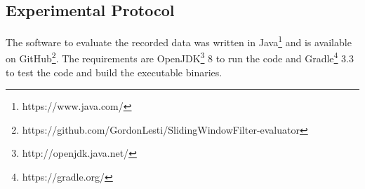 \subsection{Experimental Protocol} \label{experimental_protocol}
The software to evaluate the recorded data was written in Java\footnote{https://www.java.com/} and is available on
GitHub\footnote{https://github.com/GordonLesti/SlidingWindowFilter-evaluator}. The requirements are
OpenJDK\footnote{http://openjdk.java.net/} 8 to run the code and Gradle\footnote{https://gradle.org/} 3.3 to test the
code and build the executable binaries.




